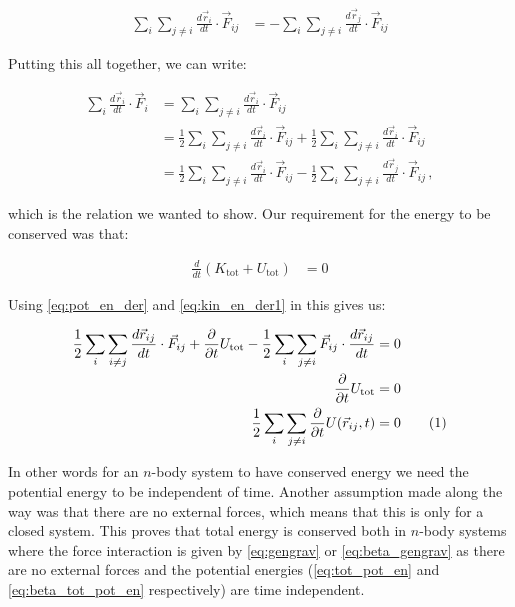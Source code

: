 \documentclass[reprint,english,notitlepage]{revtex4-1}  %
\newcommand\numberthis{\addtocounter{equation}{1}\tag{\theequation}}
\begin{document}
\begin{align*}
\sum\limits_i \sum\limits_{j \neq i} \frac{d\vec{r}_i}{dt} \cdot \vec{F}_{ij} &= -\sum\limits_i \sum\limits_{j \neq i} \frac{d\vec{r}_j}{dt} \cdot \vec{F}_{ij} 
\end{align*}

Putting this all together, we can write:

\begin{align*}
\sum\limits_i \frac{d\vec{r}_i}{dt} \cdot \vec{F}_i &= \sum\limits_i \sum\limits_{j \neq i} \frac{d\vec{r}_i}{dt} \cdot \vec{F}_{ij} \\
&= \frac{1}{2} \sum\limits_i \sum\limits_{j \neq i} \frac{d\vec{r}_i}{dt} \cdot \vec{F}_{ij} + \frac{1}{2} \sum\limits_i \sum\limits_{j \neq i} \frac{d\vec{r}_i}{dt} \cdot \vec{F}_{ij} \\
&= \frac{1}{2} \sum\limits_i \sum\limits_{j \neq i} \frac{d\vec{r}_i}{dt} \cdot \vec{F}_{ij} - \frac{1}{2} \sum\limits_i \sum\limits_{j \neq i} \frac{d\vec{r}_j}{dt} \cdot \vec{F}_{ij} \, ,
\end{align*}

which is the relation we wanted to show. Our requirement for the energy to be conserved was that:

\begin{align*}
\frac{d}{dt}(K_\text{tot} + U_\text{tot}) &= 0
\end{align*}

Using \eqref{eq:pot_en_der} and \eqref{eq:kin_en_der1} in this gives us:

\begin{align*}
\frac{1}{2}\sum\limits_i \sum\limits_{i\neq j} \frac{d\vec{r}_{ij}}{dt} \cdot \vec{F}_{ij} + \frac{\partial}{\partial t} U_\text{tot} - \frac{1}{2}\sum\limits_{i} \sum\limits_{j\neq i} \vec{F}_{ij} \cdot \frac{d\vec{r}_{ij}}{dt} &= 0 \\
\frac{\partial}{\partial t} U_\text{tot} &= 0 \\
\frac{1}{2}\sum\limits_i \sum\limits_{j\neq i } \frac{\partial}{\partial t} U(\vec{r}_{ij},t) &= 0 \numberthis \label{eq:energy_cons}
\end{align*}

In other words for an $n$-body system to have conserved energy we need the potential energy to be independent of time. Another assumption made along the way was that there are no external forces, which means that this is only for a closed system. This proves that total energy is conserved both in $n$-body systems where the force interaction is given by \eqref{eq:gengrav} or \eqref{eq:beta_gengrav} as there are no external forces and the potential energies (\eqref{eq:tot_pot_en} and \eqref{eq:beta_tot_pot_en} respectively) are time independent.
\end{document}
